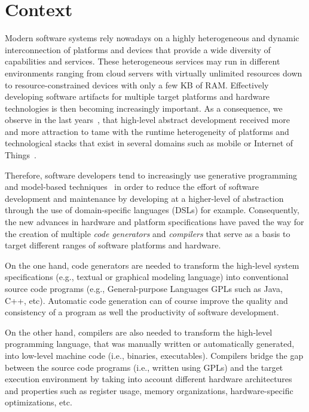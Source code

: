 

\section{Context}
Modern software systems rely nowadays on a highly heterogeneous and dynamic interconnection of platforms and devices that provide a wide diversity of capabilities and services. These heterogeneous services may run in different environments ranging from cloud servers with virtually unlimited resources down to resource-constrained devices with only a few KB of RAM. Effectively developing software artifacts for multiple target platforms and hardware technologies is then becoming increasingly important. As a consequence, we observe in the last years~\cite{Czarnecki:2000:GPM:345203}, that high-level abstract development received more and more attraction to tame with the runtime heterogeneity of platforms and technological stacks that exist in several domains such as mobile or Internet of Things~\cite{betz2011improving}.

Therefore, software developers tend to increasingly use generative programming~\cite{Czarnecki:2000:GPM:345203} and model-based techniques~\cite{france2007model} in order to reduce the effort of software development and maintenance by developing at a higher-level of abstraction through the use of domain-specific languages (DSLs) for example. 
Consequently, the new advances in hardware and platform specifications have paved the way for the creation of multiple \textit{code generators} and \textit{compilers} that serve as a basis to target different ranges of software platforms and hardware. 

On the one hand, code generators are needed to transform the high-level system specifications (e.g., textual or graphical modeling language) into conventional source code programs (e.g., General-purpose Languages GPLs such as Java, C++, etc). Automatic code generation can of course improve the quality and consistency of a program as well the productivity of software development.

On the other hand, compilers are also needed to transform the high-level programming language, that was manually written or automatically generated, into low-level machine code (i.e., binaries, executables). 
Compilers bridge the gap between the source code programs (i.e., written using GPLs) and the target execution environment by taking into account different hardware architectures and properties such as register usage, memory organizations, hardware-specific optimizations, etc. 

